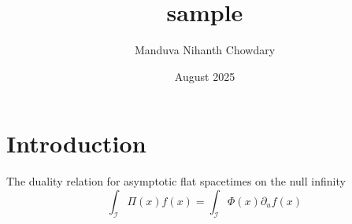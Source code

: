 \documentclass{article}
\title{sample}
\author{Manduva Nihanth Chowdary  }
\date{August 2025}
\begin{document}
\maketitle

\section{Introduction}
The duality relation for asymptotic flat spacetimes on the null infinity
\begin{equation}
    \int_\mathcal{I} \Pi(x)f(x) = \int_\mathcal{I} \Phi(x)\partial_u f(x) 
\end{equation}
\end{document}
